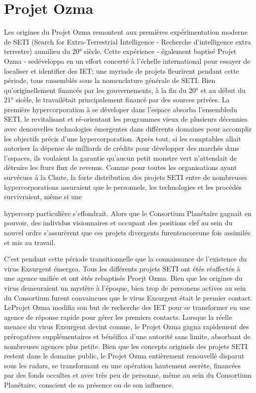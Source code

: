 {\section{Projet Ozma} 

Les origines du Projet Ozma remontent aux premières expérimentation moderne de SETI (Search for Extra-Terrestrial Intelligence - Recherche d'intelligence extra terrestre) aumilieu du 20° siècle. Cette expérience - également baptisé Projet Ozma - sedéveloppa en un effort concerté à l'échelle international pour essayer de localiser et identifier des IET; une myriade de projets fleurirent pendant cette période, tous rassemblés sous la nomenclature générale de SETI. Bien qu'originellement financés par les gouvernements, à la fin du 20° et au début du 21° sicèle, le travailétait principalement financé par des sources privées. La première hypercorporation à se déveloper dans l'espace absorba l'ensembledu SETI, le revitalisant et ré-orientant les programmes vieux de plusieurs décennies avec denouvelles technologies émergentes dans différents domaines pour accomplir les objectifs précis d'une hypercorporation. Après tout, si les comptables allait autoriser la dépense de milliards de crédits pour développer des marchés dans l'espaces, ils voulaient la garantie qu'aucun petit monstre vert n'attendait de détruire les fturs flux de revenus. Comme pour toutes les organisations ayant survécues à la Chute, la forte distribution des projets SETI entre de nombreuses hypercorporations assuraient que le personnels, les technologies et les procédés survivraient, même si une 

hypercorp particulière s'effondrait.  Alors que le Consortium Planétaire gagnait en pouvoir, des individus visionnaires et occupant des positions clef au sein du nouvel ordre s'assurèrent que ces projets divergents furentencoreune fois assimilés et mis au travail. 

C'est pendant cette période transitionnelle que la connaissance de l'existence du virus Exsurgent émergea. Tous les différents projets SETI ont étés réaffectés à une agence unifiée et ont étés rebaptisés Proejt Ozma. Bien que les origines du virus demeuraient un mystère à l'époque, bien trop de personens actives au sein du Consortium furent convaincues que le virus Exsurgent était le premier contact. LeProjet Ozma modifia son but de recherche des IET pour se transformer en une agence de réponse rapide pour gérer les premiers contacts. Lorsque la réelle menace du virus Exsurgent devint connue, le Projet Ozma gagna rapidement des prérogatives supplémentaires et bénéifica d'une autorité sans limite, absorbant de nombreuses agences plus petite. Bien que les concepts originels des projets SETI restent dans le domaine public, le Projet Ozma entièrement renouvellé disparut sous les radars, se transformant en une opération hautement secrète, financées par des fonds occultes et avec très peu de personne, même au sein du Consortium Planétaire, conscient de sa présence ou de son influence. 

}
